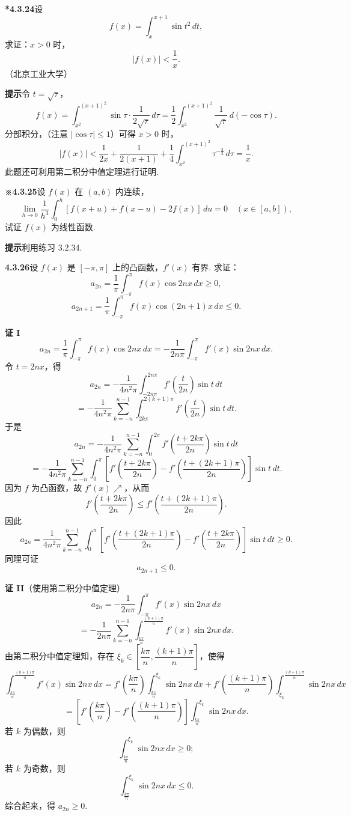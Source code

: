 \documentclass[UTF8, 12pt, fontset=fandol, oneside]{ctexart}
\begin{document}
\noindent\textbf{*4.3.24}\quad 设
\[
f(x)=\int_x^{x+1}\sin t^2\,dt,
\]
求证：$x>0$ 时，
\[
|f(x)|<\frac1x.
\]
（北京工业大学）

\noindent\textbf{提示}\quad 令 $t=\sqrt{\tau}$，
\[
f(x)=\int_{x^2}^{(x+1)^2}\sin\tau\cdot\frac1{2\sqrt\tau}\,d\tau
=\frac12\int_{x^2}^{(x+1)^2}\frac1{\sqrt\tau}\,d(-\cos\tau).
\]
分部积分，（注意 $|\cos\tau|\le1$）可得 $x>0$ 时，
\[
|f(x)|<\frac1{2x}+\frac1{2(x+1)}
+\frac14\int_{x^2}^{(x+1)^2}\tau^{-\frac32}\,d\tau=\frac1x.
\]
此题还可利用第二积分中值定理进行证明.

\noindent\textbf{※4.3.25}\quad 设 $f(x)$ 在 $(a,b)$ 内连续，
\[
\lim_{h\to0}\frac1{h^3}\int_0^h[f(x+u)+f(x-u)-2f(x)]\,du=0
\quad(x\in[a,b]),
\]
试证 $f(x)$ 为线性函数.

\noindent\textbf{提示}\quad 利用练习 3.2.34.

\noindent\textbf{4.3.26}\quad 设 $f(x)$ 是 $[-\pi,\pi]$ 上的凸函数，$f'(x)$ 有界. 求证：
\[
a_{2n}=\frac1\pi\int_{-\pi}^{\pi}f(x)\cos2nx\,dx\ge0,
\]
\[
a_{2n+1}=\frac1\pi\int_{-\pi}^{\pi}f(x)\cos(2n+1)x\,dx\le0.
\]

\noindent\textbf{证 I}\quad
\[
a_{2n}=\frac1\pi\int_{-\pi}^{\pi}f(x)\cos2nx\,dx
=-\frac1{2n\pi}\int_{-\pi}^{\pi}f'(x)\sin2nx\,dx.
\]
令 $t=2nx$，得
\[
a_{2n}=-\frac1{4n^2\pi}\int_{-2n\pi}^{2n\pi}f'\left(\frac t{2n}\right)\sin t\,dt
\]
\[
=-\frac1{4n^2\pi}\sum_{k=-n}^{n-1}
\int_{2k\pi}^{2(k+1)\pi}f'\left(\frac t{2n}\right)\sin t\,dt.
\]
于是
\[
a_{2n}=-\frac1{4n^2\pi}\sum_{k=-n}^{n-1}
\int_0^{2\pi}f'\left(\frac{t+2k\pi}{2n}\right)\sin t\,dt
\]
\[
=-\frac1{4n^2\pi}\sum_{k=-n}^{n-1}
\int_0^\pi\left[
f'\left(\frac{t+2k\pi}{2n}\right)
-f'\left(\frac{t+(2k+1)\pi}{2n}\right)\right]\sin t\,dt.
\]
因为 $f$ 为凸函数，故 $f'(x)\nearrow$，从而
\[
f'\left(\frac{t+2k\pi}{2n}\right)
\le f'\left(\frac{t+(2k+1)\pi}{2n}\right).
\]
因此
\[
a_{2n}=\frac1{4n^2\pi}\sum_{k=-n}^{n-1}
\int_0^\pi\left[
f'\left(\frac{t+(2k+1)\pi}{2n}\right)
-f'\left(\frac{t+2k\pi}{2n}\right)\right]\sin t\,dt\ge0.
\]
同理可证
\[
a_{2n+1}\le0.
\]

\noindent\textbf{证 II}\quad（使用第二积分中值定理）
\[
a_{2n}=-\frac1{2n\pi}\int_{-\pi}^{\pi}f'(x)\sin2nx\,dx
\]
\[
=-\frac1{2n\pi}\sum_{k=-n}^{n-1}
\int_{\frac{k\pi}{n}}^{\frac{(k+1)\pi}{n}}f'(x)\sin2nx\,dx.
\]
由第二积分中值定理知，存在
$\xi_k\in\left[\dfrac{k\pi}{n},\dfrac{(k+1)\pi}{n}\right]$，使得
\[
\int_{\frac{k\pi}{n}}^{\frac{(k+1)\pi}{n}}f'(x)\sin2nx\,dx
=f'\left(\frac{k\pi}{n}\right)
\int_{\frac{k\pi}{n}}^{\xi_k}\sin2nx\,dx
+f'\left(\frac{(k+1)\pi}{n}\right)
\int_{\xi_k}^{\frac{(k+1)\pi}{n}}\sin2nx\,dx
\]
\[
=\left[f'\left(\frac{k\pi}{n}\right)
-f'\left(\frac{(k+1)\pi}{n}\right)\right]
\int_{\frac{k\pi}{n}}^{\xi_k}\sin2nx\,dx.
\]
若 $k$ 为偶数，则
\[
\int_{\frac{k\pi}{n}}^{\xi_k}\sin2nx\,dx\ge0;
\]
若 $k$ 为奇数，则
\[
\int_{\frac{k\pi}{n}}^{\xi_k}\sin2nx\,dx\le0.
\]
综合起来，得 $a_{2n}\ge0$.
\end{document}
